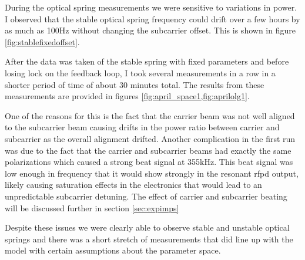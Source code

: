 During the optical spring measurements we were sensitive to variations in
power.
I observed that the stable optical spring frequency could drift over a few
hours by as much as 100Hz without changing the subcarrier offset.
This is shown in figure \ref{fig:stablefixedoffset}.

After the data was taken of the stable spring with fixed parameters and before
losing lock on the feedback loop, I took several measurements in a row in a
shorter period of time of about 30 minutes total. The results from these
measurements are provided in figures \ref{fig:april_space1,fig:aprilolg1}.

One of the reasons for this is the fact that the carrier beam was not
well aligned to the subcarrier beam causing drifts in the power ratio between
carrier and subcarrier as the overall alignment drifted.
Another complication in the first run was due to the fact that the carrier and
subcarrier beams had exactly the same polarizations which caused a strong
beat signal at 355kHz. This beat signal was low enough in frequency that
it would show strongly in the resonant \ac{rfpd} output, likely causing
saturation effects in the electronics that would lead to an unpredictable
subcarrier detuning.
The effect of carrier and subcarrier beating will be discussed further in
section \ref{sec:expimps}

Despite these issues we were clearly able to observe
stable and unstable optical springs and there was a short stretch of
measurements that did line up with the model with certain assumptions
about the parameter space.


